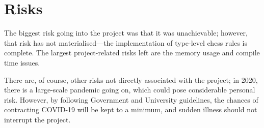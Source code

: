 \documentclass[12pt, a4paper, bibliography=totocnumbered]{scrartcl}
\begin{document}

\section{Risks}

The biggest risk going into the project was that it was unachievable; however, that risk has not materialised---the implementation of type-level chess rules is complete. The largest project-related risks left are the memory usage and compile time issues. 

There are, of course, other risks not directly associated with the project; in 2020, there is a large-scale pandemic going on, which could pose considerable personal risk. However, by following Government and University guidelines, the chances of contracting COVID-19 will be kept to a minimum, and sudden illness should not interrupt the project.






\end{document}
